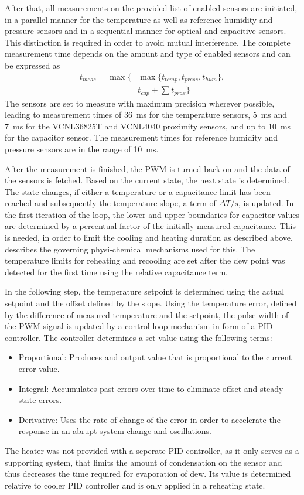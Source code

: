 After that, all measurements on the provided list of enabled sensors are initiated, in a parallel manner for the temperature as well as reference humidity and pressure sensors and in a sequential manner for optical and capacitive sensors. This distinction is required in order to avoid mutual interference. The complete measurement time depends on the amount and type of enabled sensors and can be expressed as 
\begin{align*}
    t_{meas} = \max \{ &\max \{t_{temp}, t_{press}, t_{hum}\}, \\
    &t_{cap} + \sum t_{prox} \}
\end{align*}
The sensors are set to measure with maximum precision wherever possible, leading to measurement times of \qty{36}{\ms} for the temperature sensors, \qty{5}{\ms} and \qty{7}{\ms} for the VCNL36825T and VCNL4040 proximity sensors, and up to \qty{10}{\ms} for the capacitor sensor. The measurement times for reference humidity and pressure sensors are in the range of \qty{10}{\ms}.

After the measurement is finished, the \gls{PWM} is turned back on and the data of the sensors is fetched. Based on the current state, the next state is determined. The state changes, if either a temperature or a capacitance limit has been reached and subsequently the temperature slope, a term of $\Delta T / s$, is updated. In the first iteration of the loop, the lower and upper boundaries for capacitor values are determined by a percentual factor of the initially measured capacitance. This is needed, in order to limit the cooling and heating duration as described above.  describes the governing physi-chemical mechanisms used for this. The temperature limits for reheating and recooling are set after the dew point was detected for the first time using the relative capacitance term.

In the following step, the temperature setpoint is determined using the actual setpoint and the offset defined by the slope. Using the temperature error, defined by the difference of measured temperature and the setpoint, the pulse width of the \gls{PWM} signal is updated by a control loop mechanism in form of a \gls{PID} controller. The controller determines a set value using the following terms:
\begin{itemize}
    \item Proportional: Produces and output value that is proportional to the current error value.
    \item Integral: Accumulates past errors over time to eliminate offset and steady-state errors.
    \item Derivative: Uses the rate of change of the error in order to accelerate the response in an abrupt system change and oscillations.
\end{itemize}
The heater was not provided with a seperate PID controller, as it only serves as a supporting system, that limits the amount of condensation on the sensor and thus decreases the time required for evaporation of dew. Its value is determined relative to cooler PID controller and is only applied in a reheating state.

